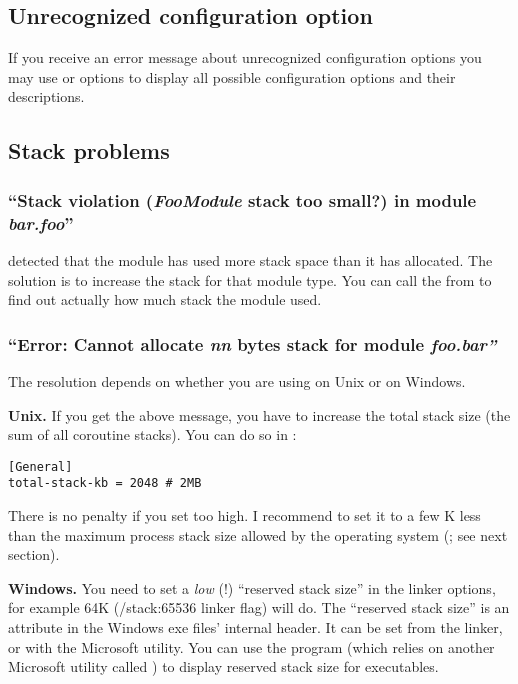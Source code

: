 \subsection{Unrecognized configuration option}

If you receive an error message about unrecognized configuration
options you may use  or  options
to display all possible configuration options and their descriptions.

\subsection{Stack problems}

\subsubsection{``Stack violation (\textit{FooModule} stack too small?) in module \textit{bar.foo}''}

{\opp} detected that the module has used more stack space than it has
allocated. The solution is to increase the stack for that module type.
You can call the  from  to find out
actually how much stack the module used.


\subsubsection{``Error: Cannot allocate \textit{nn} bytes stack for module \textit{foo.bar''}}

The resolution depends on whether you are using {\opp} on Unix or on Windows.

\textbf{Unix.}
If you get the above message, you have to increase the total stack
size (the sum of all coroutine stacks). You can do
so in :

\begin{verbatim}
[General]
total-stack-kb = 2048 # 2MB
\end{verbatim}

There is no penalty if you set  too high. I
recommend to set it to a few K less than the maximum process stack
size allowed by the operating system (; see
next section).


\textbf{Windows.}
You need to set a \textit{low} (!) ``reserved stack size''
in the linker options, for example 64K (/stack:65536 linker flag) will do.
The ``reserved stack size'' is an attribute in the Windows exe
files' internal header. It can be set from the linker, or with
the  Microsoft utility. You can use the 
program (which relies on another Microsoft utility called )
to display reserved stack size for executables.

